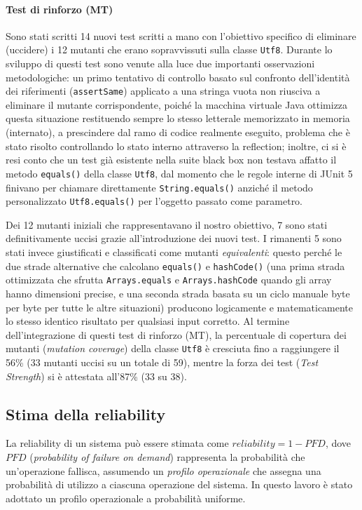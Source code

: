 \paragraph{Test di rinforzo (MT)} 
Sono stati scritti 14 nuovi test scritti a mano con l'obiettivo specifico 
di eliminare (uccidere) i 12 mutanti che erano sopravvissuti 
sulla classe \texttt{Utf8}. 
Durante lo sviluppo di questi test sono venute alla luce due importanti osservazioni metodologiche: 
un primo tentativo di controllo basato sul confronto dell'identità dei riferimenti 
(\texttt{assertSame}) applicato a una stringa vuota non riusciva a eliminare il mutante corrispondente, 
poiché la macchina virtuale Java ottimizza questa situazione restituendo sempre 
lo stesso letterale memorizzato in memoria (internato), a prescindere dal ramo di codice realmente eseguito, 
problema che è stato risolto controllando lo stato interno attraverso la reflection; 
inoltre, ci si è resi conto che un test già esistente nella suite black box
non testava affatto il metodo \texttt{equals()} della classe \texttt{Utf8}, 
dal momento che le regole interne di JUnit 5 finivano per chiamare direttamente \texttt{String.equals()} 
anziché il metodo personalizzato \texttt{Utf8.equals()} per l'oggetto passato come parametro.

Dei 12 mutanti iniziali che rappresentavano il nostro obiettivo, 
7 sono stati definitivamente uccisi grazie all'introduzione dei nuovi test. 
I rimanenti 5 sono stati invece giustificati e classificati come mutanti \emph{equivalenti}: 
questo perché le due strade alternative che calcolano \texttt{equals()} e \texttt{hashCode()} 
(una prima strada ottimizzata che sfrutta \texttt{Arrays.equals} e \texttt{Arrays.hashCode} 
quando gli array hanno dimensioni precise, e una seconda strada basata su un ciclo manuale byte per byte 
per tutte le altre situazioni) producono logicamente e matematicamente lo stesso identico risultato 
per qualsiasi input corretto.
Al termine dell'integrazione di questi test di rinforzo (MT), 
la percentuale di copertura dei mutanti (\emph{mutation coverage}) della classe \texttt{Utf8} 
è cresciuta fino a raggiungere il 56\% (33 mutanti uccisi su un totale di 59), 
mentre la forza dei test (\emph{Test Strength}) si è attestata all'87\% (33 su 38).
\subsection{Stima della reliability}

La reliability di un sistema può essere stimata come
$reliability = 1 - PFD$, dove $PFD$ (\emph{probability of failure on
demand}) rappresenta la probabilità che un'operazione fallisca,
assumendo un \emph{profilo operazionale} che assegna una probabilità
di utilizzo a ciascuna operazione del sistema. In questo lavoro è
stato adottato un profilo operazionale a probabilità uniforme.

